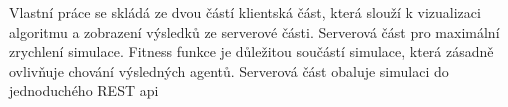 Vlastní práce se skládá ze dvou částí klientská část, která slouží k vizualizaci algoritmu a zobrazení výsledků ze serverové části. Serverová část pro maximální zrychlení simulace. 
Fitness funkce je důležitou součástí simulace, která zásadně ovlivňuje chování výsledných agentů.
Serverová část obaluje simulaci do jednoduchého REST api
